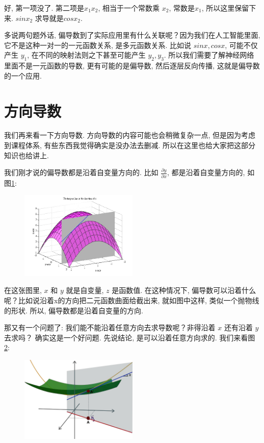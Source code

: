 好, 第一项没了. 第二项是$x_1x_2$, 相当于一个常数乘 $x_2$, 常数是$x_1$, 所以这里保留下来. $sinx_2$ 求导就是$cosx_2$. 

多说两句题外话, 偏导数到了实际应用里有什么关联呢？因为我们在人工智能里面, 它不是这种一对一的一元函数关系, 是多元函数关系. 比如说 $sinx, cosx$, 可能不仅产生 $y_1$, 在不同的映射法则之下甚至可能产生 $y_2, y_3$. 所以我们需要了解神经网络里面不是一元函数的导数, 更有可能的是偏导数, 然后逐层反向传播, 这就是偏导数的一个应用. 

\section{方向导数}

我们再来看一下方向导数. 方向导数的内容可能也会稍微复杂一点, 但是因为考虑到课程体系, 有些东西我觉得确实是没办法去删减. 所以在这里也给大家把这部分知识也给讲上. 

我们刚才说的偏导数都是沿着自变量方向的. 比如 $\frac{\partial y}{\partial x}$, 都是沿着自变量方向的, 如图\ref{fig:img12_1}: 

\begin{figure}[ht]
  \centering
  \includegraphics[width=0.5\textwidth]{asset/20230901095029.png}
  \caption{}
  \label{fig:img12_1}
\end{figure}

在这张图里, $x$ 和 $y$ 就是自变量, $z$ 是函数值. 在这种情况下, 偏导数可以沿着什么呢？比如说沿着x的方向把二元函数曲面给截出来, 就如图中这样, 类似一个抛物线的形状. 所以, 偏导数都是沿着自变量的方向. 

那又有一个问题了: 我们能不能沿着任意方向去求导数呢？非得沿着 $x$ 还有沿着 $y$ 去求吗？ 确实这是一个好问题. 先说结论, 是可以沿着任意方向求的. 我们来看图 \ref{fig:img12_2}: 

\begin{figure}[ht]
  \centering
  \includegraphics[width=0.5\textwidth]{asset/20230901095643.png}
  \caption{}
  \label{fig:img12_2}
\end{figure}

